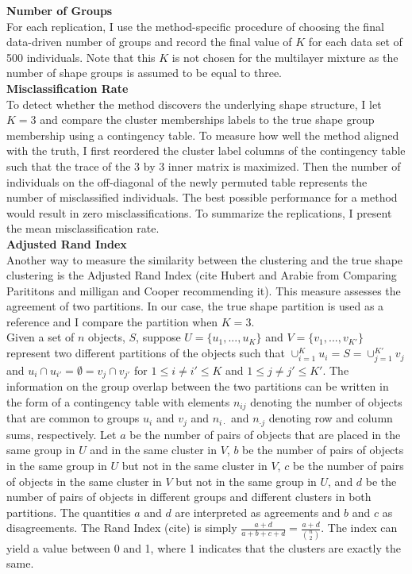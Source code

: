 \textbf{Number of Groups}\\
For each replication, I use the method-specific procedure of choosing the final data-driven number of groups and record the final value of $K$ for each data set of 500 individuals. Note that this $K$ is not chosen for the multilayer mixture as the number of shape groups is assumed to be equal to three.\\

\textbf{Misclassification Rate}\\
To detect whether the method discovers the underlying shape structure, I let $K=3$ and compare the cluster memberships labels to the true shape group membership using a contingency table. To measure how well the method aligned with the truth, I first reordered the cluster label columns of the contingency table such that the trace of the 3 by 3 inner matrix is maximized. Then the number of individuals on the off-diagonal of the newly permuted table represents the number of misclassified individuals. The best possible performance for a method would result in zero misclassifications. To summarize the replications, I present the mean misclassification rate.\\

\textbf{Adjusted Rand Index}\\
Another way to measure the similarity between  the clustering and the true shape clustering is the Adjusted Rand Index (cite Hubert and Arabie from Comparing Parititons and milligan and Cooper recommending it). This measure assesses the agreement of two partitions. In our case, the true shape partition is used as a reference and I compare the partition when $K=3$.\\
 
Given a set of $n$ objects, $S$, suppose $U = \{u_{1},...,u_{K}\}$ and $V=\{v_{1},...,v_{K'}\}$ represent two different partitions of the objects such that $\cup^{K}_{i=1}u_{i} = S = \cup^{K'}_{j=1}v_{j}$ and $u_{i}\cap u_{i'} = \emptyset = v_{j}\cap v_{j'}$ for $1\leq i\not=i'\leq K$ and $1\leq j\not= j'\leq K'$. The information on the group overlap between the two partitions can be written in the form of a contingency table with elements $n_{ij}$ denoting the number of objects that are common to groups $u_{i}$ and $v_{j}$ and $n_{i\cdot}$ and $n_{\cdot j}$ denoting row and column sums, respectively. Let $a$ be the number of pairs of objects that are placed in the same group in $U$ and in the same cluster in $V$, $b$ be the number of pairs of objects in the same group in $U$ but not in the same cluster in $V$, $c$ be the number of pairs of objects in the same cluster in $V$ but not in the same group in $U$, and $d$ be the number of pairs of objects in different groups and different clusters in both partitions. The quantities $a$ and $d$ are interpreted as agreements and $b$ and $c$ as disagreements. The Rand Index (cite) is simply $\frac{a+d}{a+b+c+d}=\frac{a+d}{{n \choose 2}}$.  The index can yield a value between 0 and 1, where 1 indicates that the clusters are exactly the same.\\

